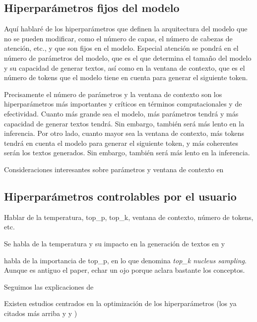 \subsection{Hiperparámetros fijos del modelo}
Aquí hablaré de los hiperparámetros que definen la arquitectura del modelo que no se pueden modificar, como el número de capas, el número de cabezas de atención, etc., y que son fijos en el modelo. Especial atención se pondrá en el número de parámetros del modelo, que es el que determina el tamaño del modelo y su capacidad de generar textos, así como en la ventana de contexto, que es el número de tokens que el modelo tiene en cuenta para generar el siguiente token.

Precisamente el número de parámetros y la ventana de contexto son los hiperparámetros más importantes y críticos en términos computacionales y de efectividad. Cuanto más grande sea el modelo, más parámetros tendrá y más capacidad de generar textos tendrá. Sin embargo, también será más lento en la inferencia. Por otro lado, cuanto mayor sea la ventana de contexto, más tokens tendrá en cuenta el modelo para generar el siguiente token, y más coherentes serán los textos generados. Sin embargo, también será más lento en la inferencia.

Consideraciones interesantes sobre parámetros y ventana de contexto en \cite{gonzaloAsomandonosVentanaContextual2023}

\subsection{Hiperparámetros controlables por el usuario}
\label{sec:hiperparametros_controlables}
Hablar de la temperatura, top\_p, top\_k, ventana de contexto, número de tokens, etc. 

Se habla de la temperatura y su impacto en la generación de textos en \cite{holtzmanCuriousCaseNeural2020} y \cite{chamandFinetuneYourClassifier2022}

\cite{holtzmanCuriousCaseNeural2020} habla de la importancia de top\_p, en lo que denomina \textit{top\_k nucleus sampling}. Aunque es antiguo el paper, echar un ojo porque aclara bastante los conceptos.

Seguimos las explicaciones de \cite{rothmanTransformersNaturalLanguage2021}

Existen estudios centrados en la optimización de los hiperparámetros (los ya citados más arriba y \cite{wangCostEffectiveHyperparameterOptimization2023} y \cite{wangHyperparameterOptimizationAlgorithm2022})


